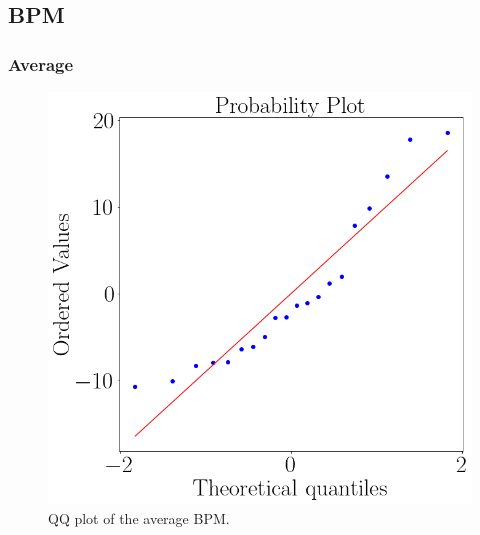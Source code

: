 \subsection{BPM}
    \subsubsection{Average}
        \begin{figure}[!htb]
            \begin{minipage}{0.45\linewidth}
                \centering
                \includegraphics[width = \linewidth]{Resultados/ECG/Figuras/png/qqplot_bpm.png}
                \caption{QQ plot of the average BPM.}
                \label{fig:qqplot_bom_average}
            \end{minipage}
            \begin{minipage}{0.1\linewidth}
                \hfill
            \end{minipage}
            \begin{minipage}{0.45\linewidth}
                \centering

\end{minipage}
\end{figure}
